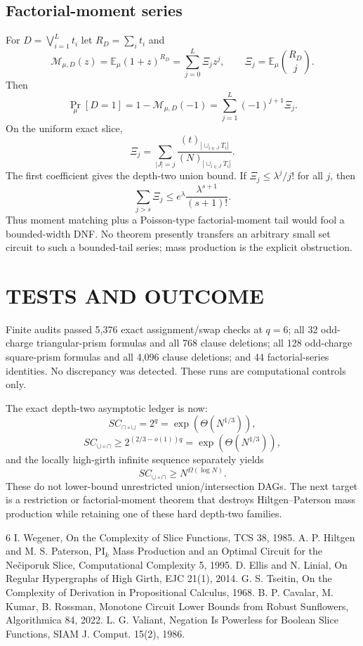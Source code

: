 \documentclass[11pt]{article}
\begin{document}
\subsection{Factorial-moment series}
For $D=\bigvee_{i=1}^{L}t_i$ let $R_D=\sum_i t_i$ and
\[
\mathcal M_{\mu,D}(z)=\mathbb E_\mu(1+z)^{R_D}=\sum_{j=0}^{L}\Xi_jz^j,
\qquad
\Xi_j=\mathbb E_\mu\binom{R_D}{j}.
\]
Then
\[
\Pr_\mu[D=1]=1-\mathcal M_{\mu,D}(-1)=\sum_{j=1}^{L}(-1)^{j+1}\Xi_j.
\]
On the uniform exact slice,
\[
\Xi_j=\sum_{|J|=j}\frac{(t)_{|\cup_{i\in J}T_i|}}{(N)_{|\cup_{i\in J}T_i|}}.
\]
The first coefficient gives the depth-two union bound. If $\Xi_j\le\lambda^j/j!$ for all $j$, then
\[
\sum_{j>s}\Xi_j\le e^\lambda\frac{\lambda^{s+1}}{(s+1)!}.
\]
Thus moment matching plus a Poisson-type factorial-moment tail would fool a bounded-width DNF. No theorem presently transfers an arbitrary small set circuit to such a bounded-tail series; mass production is the explicit obstruction.

\section{TESTS AND OUTCOME}
Finite audits passed 5,376 exact assignment/swap checks at $q=6$; all 32 odd-charge triangular-prism formulas and all 768 clause deletions; all 128 odd-charge square-prism formulas and all 4,096 clause deletions; and 44 factorial-series identities. No discrepancy was detected. These runs are computational controls only.

The exact depth-two asymptotic ledger is now:
\[
SC_{\cap\circ\cup}=2^q=\exp(\Theta(N^{1/3})),
\]
\[
SC_{\cup\circ\cap}\ge2^{(2/3-o(1))q}=\exp(\Theta(N^{1/3})),
\]
and the locally high-girth infinite sequence separately yields
\[
SC_{\cup\circ\cap}\ge N^{\Omega(\log N)}.
\]
These do not lower-bound unrestricted union/intersection DAGs. The next target is a restriction or factorial-moment theorem that destroys Hiltgen--Paterson mass production while retaining one of these hard depth-two families.

\begin{thebibliography}{6}
 I. Wegener, On the Complexity of Slice Functions, TCS 38, 1985.
 A. P. Hiltgen and M. S. Paterson, PI$_k$ Mass Production and an Optimal Circuit for the Ne\v{c}iporuk Slice, Computational Complexity 5, 1995.
 D. Ellis and N. Linial, On Regular Hypergraphs of High Girth, EJC 21(1), 2014.
 G. S. Tseitin, On the Complexity of Derivation in Propositional Calculus, 1968.
 B. P. Cavalar, M. Kumar, B. Rossman, Monotone Circuit Lower Bounds from Robust Sunflowers, Algorithmica 84, 2022.
 L. G. Valiant, Negation Is Powerless for Boolean Slice Functions, SIAM J. Comput. 15(2), 1986.
\end{thebibliography}
\end{document}
